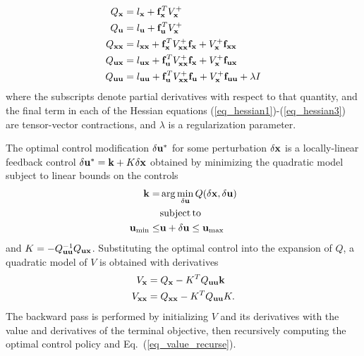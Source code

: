 \begin{align}
	Q_{\mathbf{x}} &= l_{\mathbf{x}} + \mathbf{f}_{\mathbf{x}}^T V^+_{\mathbf{x}} \\
	Q_{\mathbf{u}} &= l_{\mathbf{u}} + \mathbf{f}_{\mathbf{u}}^T V^+_{\mathbf{x}} \\
	Q_{\mathbf{x}\mathbf{x}} &= l_{\mathbf{x}\mathbf{x}} + \mathbf{f}_{\mathbf{x}}^T V^+_{\mathbf{x}\mathbf{x}}\mathbf{f}_{\mathbf{x}} + V^+_{\mathbf{x}} \mathbf{f}_{\mathbf{x}\mathbf{x}} \label{eq_hessian1}\\
	Q_{\mathbf{u}\mathbf{x}} &= l_{\mathbf{u}\mathbf{x}} + \mathbf{f}_{\mathbf{u}}^T V^+_{\mathbf{x}\mathbf{x}}\mathbf{f}_{\mathbf{x}} + V^+_{\mathbf{x}} \mathbf{f}_{\mathbf{u}\mathbf{x}} \label{eq_hessian2}\\
	Q_{\mathbf{u}\mathbf{u}} &= l_{\mathbf{u}\mathbf{u}} + \mathbf{f}_{\mathbf{u}}^T V^+_{\mathbf{x}\mathbf{x}}\mathbf{f}_{\mathbf{u}} + V^+_{\mathbf{x}} \mathbf{f}_{\mathbf{u}\mathbf{u}} +\lambda I \label{eq_hessian3}
\end{align}
where the subscripts denote partial derivatives with respect to that quantity, and the final term in each of the Hessian equations (\ref{eq_hessian1})-(\ref{eq_hessian3}) are tensor-vector contractions, and $ \lambda $ is a regularization parameter.  %

The optimal control modification $\delta\mathbf{u}^*$ for some perturbation $\delta\mathbf{x}$ is a locally-linear feedback control $\delta\mathbf{u}^* = \mathbf{k} + K\delta\mathbf{x}$ obtained by minimizing the quadratic model subject to linear bounds on the controls
\begin{align}
	\mathbf{k} = &\arg\min_{\delta\mathbf{u}} Q(\delta\mathbf{x},\delta\mathbf{u}) \\
	&\mathrm{subject\,to\,\;} \nonumber\\
	\mathbf{u}_{\min}\le &\mathbf{u}+\delta\mathbf{u} \le\mathbf{u}_{\max}
\end{align}
and $K = -Q_{\mathbf{u}\mathbf{u}}^{-1}Q_{\mathbf{u}\mathbf{x}}$. Substituting the optimal control into the expansion of $Q$, a quadratic model of $V$ is obtained with derivatives
\begin{align}
	\begin{split}
		\label{eq_value_recurse}
		V_{\mathbf{x}} &= Q_{\mathbf{x}}- K^TQ_{\mathbf{u}\mathbf{u}}\mathbf{k}\\
		V_{\mathbf{x}\mathbf{x}} &= Q_{\mathbf{x}\mathbf{x}} - K^TQ_{\mathbf{u}\mathbf{u}}K.
	\end{split}
\end{align}
The backward pass is performed by initializing $V$ and its derivatives with the value and derivatives of the terminal objective, then recursively computing the optimal control policy and Eq.~(\ref{eq_value_recurse}). 

